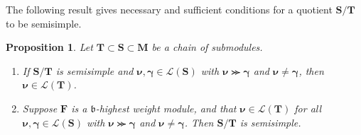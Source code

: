 \documentclass[11pt,fleqn]{amsart}
\newtheorem{prop}[thm]{Proposition}
\theoremstyle{definition}
\theoremstyle{remark}
\theoremstyle{remark}
\newcommand\lie[1]{\mathfrak{#1}}
\newcommand\wt[1]{\boldsymbol{#1}}
\begin{document}
The following result gives necessary and sufficient conditions for a quotient 
$\mathbf S / \mathbf T$ to be semisimple.  
\begin{prop}
\label{prop:ss-quotients}
Let $\mathbf T \subset \mathbf S \subset \mathbf M$ be a chain of submodules.
\begin{enumerate}
  \item If $\mathbf S/\mathbf T$ is semisimple and $\wt\nu, \wt\gamma \in 
    \mathcal L(\mathbf S)$ with $\wt\nu \ggcurly \wt\gamma$ and $\wt\nu \neq 
    \wt\gamma$, then $\wt\nu \in \mathcal L(\mathbf T)$.

  \item Suppose $\mathbf F$ is a $\lie b$-highest weight module, and that 
    $\wt\nu \in \mathcal L(\mathbf T)$ for all $\wt\nu, \wt\gamma \in \mathcal 
    L(\mathbf S)$ with $\wt\nu \ggcurly \wt\gamma$ and $\wt\nu \neq \wt\gamma$. Then $\mathbf S/\mathbf T$ is semisimple.
\end{enumerate}
\end{prop}
\end{document}
